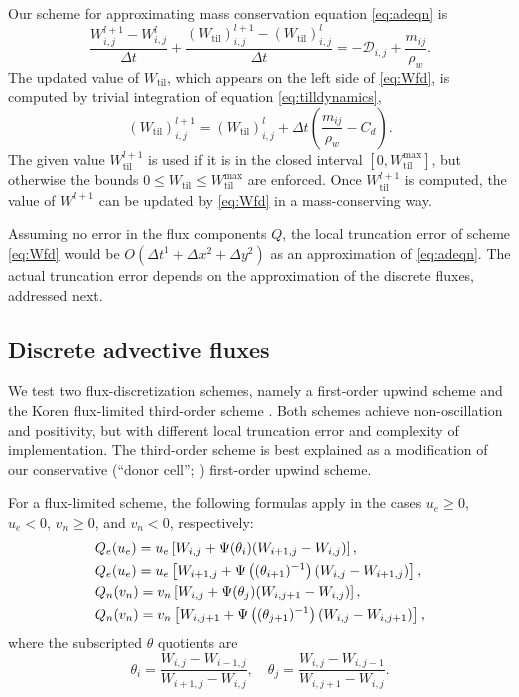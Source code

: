 \documentclass[gmd]{copernicus}   %
\begin{document}
Our scheme for approximating mass conservation equation \eqref{eq:adeqn} is
\begin{equation}
\frac{W_{i,j}^{l+1} - W_{i,j}^l}{\Delta t} + \frac{(W_{\text{til}})_{i,j}^{l+1} - (W_{\text{til}})_{i,j}^l}{\Delta t} = - \mathcal{D}_{i,j} + \frac{m_{ij}}{\rho_w}.    \label{eq:Wfd}
\end{equation}
The updated value of $W_{\text{til}}$, which appears on the left side of \eqref{eq:Wfd}, is computed by trivial integration of equation \eqref{eq:tilldynamics},
\begin{equation}
(W_{\text{til}})_{i,j}^{l+1} = (W_{\text{til}})_{i,j}^l + \Delta t \left(\frac{m_{ij}}{\rho_w} - C_d\right).  \label{eq:tillupdatefd}
\end{equation}
The given value $W_{\text{til}}^{l+1}$ is used if it is in the closed interval $[0,W_{\text{til}}^{\text{max}}]$, but otherwise the bounds $0\le W_{\text{til}} \le W_{\text{til}}^{\text{max}}$ are enforced.  Once $W_{\text{til}}^{l+1}$ is computed, the value of $W^{l+1}$ can be updated by \eqref{eq:Wfd} in a mass-conserving way.

Assuming no error in the flux components $Q$, the local truncation error \citep{MortonMayers} of scheme \eqref{eq:Wfd} would be $O(\Delta t^1 + \Delta x^2 + \Delta y^2)$ as an approximation of \eqref{eq:adeqn}.  The actual truncation error depends on the approximation of the discrete fluxes, addressed next.

\subsection{Discrete advective fluxes}  \label{subsect:discretefluxes}  We test two flux-discretization schemes, namely a first-order upwind scheme and the Koren flux-limited third-order scheme \citep{HundsdorferVerwer2010}.  Both schemes achieve non-oscillation and positivity, but with different local truncation error and complexity of implementation.  The third-order scheme is best explained as a modification of our conservative (``donor cell''; \cite{LeVeque}) first-order upwind scheme.

For a flux-limited scheme, the following formulas apply in the cases $u_e \ge 0$, $u_e < 0$, $v_n \ge 0$, and $v_n < 0$, respectively:
\begin{align}
&Q_e(u_e) = u_e \left[W_{i,j} + \Psi(\theta_{i}) (W_{i+1,j} - W_{i,j})\right], \label{eq:adfluxes} \\ 
&Q_e(u_e) = u_e \left[W_{i+1,j} + \Psi\left((\theta_{i+1})^{-1}\right) (W_{i,j} - W_{i+1,j})\right],  \notag \\
&Q_n(v_n) = v_n \left[W_{i,j} + \Psi(\theta_{j}) (W_{i,j+1} - W_{i,j})\right], \notag \\
&Q_n(v_n) = v_n \left[W_{i,j+1} + \Psi\left((\theta_{j+1})^{-1}\right) (W_{i,j} - W_{i,j+1})\right],\notag
\end{align}
where the subscripted $\theta$ quotients are
\begin{equation*}
\theta_i = \frac{W_{i,j}-W_{i-1,j}}{W_{i+1,j} - W_{i,j}}, \quad \theta_j = \frac{W_{i,j}-W_{i,j-1}}{W_{i,j+1} - W_{i,j}}.
\end{equation*}
\end{document}
